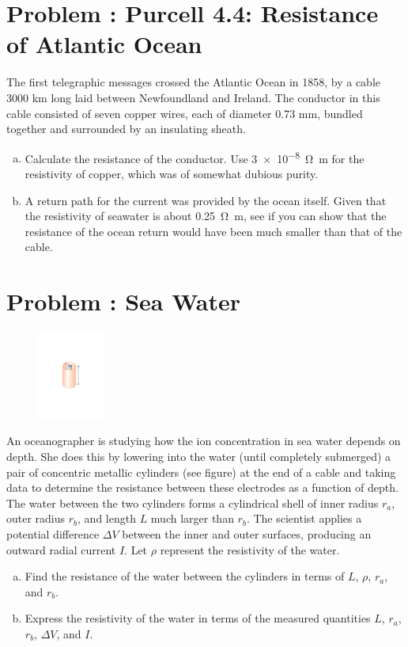 \documentclass[problems]{esg8022pset}
\date{\today }
\begin{document}
\section{Problem \thesection: Purcell 4.4: Resistance of Atlantic Ocean}
  The first telegraphic messages crossed the Atlantic Ocean in 1858, by a cable 3000 km long laid between Newfoundland and Ireland. The conductor in this cable consisted of seven copper wires, each of diameter 0.73 mm, bundled together and surrounded by an insulating sheath.
  \begin{enumerate}[(a)]
    \item Calculate the resistance of the conductor. Use \SI{3e-8}{\ohm\meter} for the resistivity of copper, which was of somewhat dubious purity.
    \item A return path for the current was provided by the ocean itself. Given that the resistivity of seawater is about \SI{0.25}{\ohm\meter}, see if you can show that the resistance of the ocean return would have been much smaller than that of the cable.
  \end{enumerate}
\section{Problem \thesection: Sea Water}
  \begin{figure}
    \begin{center}\includegraphics[width=0.20\textwidth]{ps06_02_01.pdf}\end{center}
  \end{figure}
  An oceanographer is studying how the ion concentration in sea water depends on depth. She does this by lowering into the water (until completely submerged) a pair of concentric metallic cylinders (see figure) at the end of a cable and taking data to determine the resistance between these electrodes as a function of depth. The water between the two cylinders forms a cylindrical shell of inner radius $r_a$, outer radius $r_b$, and length $L$ much larger than $r_b$. The scientist applies a potential difference $\Delta V$ between the inner and outer surfaces, producing an outward radial current $I$. Let $\rho$ represent the resistivity of the water.
  \begin{enumerate}[(a)]
    \item Find the resistance of the water between the cylinders in terms of $L$, $\rho$, $r_a$, and $r_b$.
    \item Express the resistivity of the water in terms of the measured quantities $L$, $r_a$, $r_b$, $\Delta V$, and $I$.
  \end{enumerate}
\end{document}
